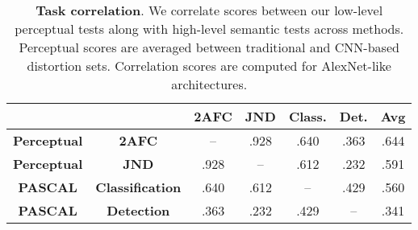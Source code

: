\begin{table}[t!]
\begin{center}
\resizebox{\linewidth}{!} {
\begin{tabular}{ c c | c c c c | c}
& & \textbf{2AFC} & \textbf{JND} & \textbf{Class.} & \textbf{Det.} & \textbf{Avg} \\
\midrule
\textbf{Perceptual} & \textbf{2AFC} & -- & .928 & .640 & .363 & .644 \\
\textbf{Perceptual} & \textbf{JND} & .928 & -- & .612 & .232 & .591 \\
\textbf{PASCAL} & \textbf{Classification} & .640 & .612 & -- & .429 & .560 \\
\textbf{PASCAL} & \textbf{Detection} &.363 & .232 & .429 & -- & .341 \\
\end{tabular}
}
\vspace{-2mm}
\caption{\textbf{Task correlation}. We correlate scores between our low-level perceptual tests along with high-level semantic tests across methods. Perceptual scores are averaged between traditional and CNN-based distortion sets. Correlation scores are computed for AlexNet-like architectures.}
\label{tab:corr}
\vspace{-8mm}
\end{center}
\end{table}
